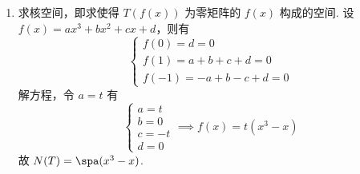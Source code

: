 \begin{exercise}
\begin{exgroup}
        \begin{answer}
            \begin{enumerate}
                \item \label{item:7:B:5:1}
                      求核空间，即求使得 $ T(f(x)) $ 为零矩阵的 $ f(x) $ 构成的空间. 设 $ f(x) = ax^3 + bx^2 + cx + d $，则有
                      \[ \begin{cases}
                              f(0) = d = 0             \\
                              f(1) = a + b + c + d = 0 \\
                              f(-1) = -a + b -c + d = 0
                          \end{cases} \]
                      解方程，令 $ a = t $ 有
                      \[ \begin{cases}
                              a = t  \\
                              b = 0  \\
                              c = -t \\
                              d = 0
                          \end{cases} \implies f(x) = t(x^3 - x) \]
                      故 $ N(T) = \spa(x^3 - x) $.


\end{enumerate}
\end{answer}
\end{exgroup}
\end{exercise}
